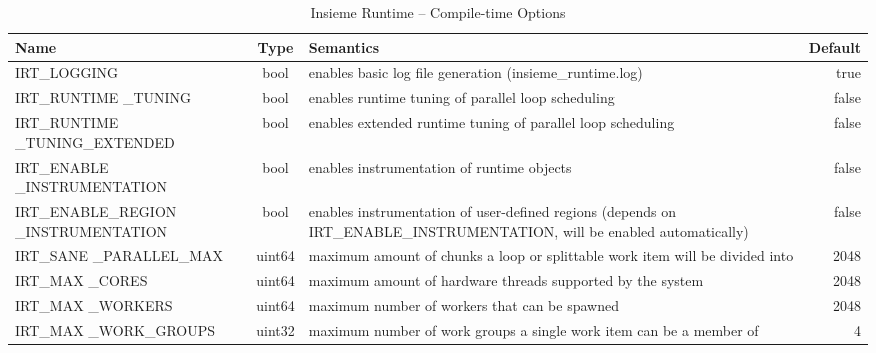\begin{table}[htbp] \small
	\centering
    \begin{tabular}{|p{4cm}|c|p{6cm}|r|}
        \hline
        Name                              & Type   & Semantics                                                                      & Default \\ \hline \hline
        IRT\_LOGGING                       & bool   & enables basic log file generation (insieme\_runtime.log)                                                                & true          \\ \hline
        IRT\_RUNTIME \_TUNING                & bool   & enables runtime tuning of parallel loop scheduling                                                                     & false         \\ \hline
        IRT\_RUNTIME \_TUNING\_EXTENDED       & bool   & enables extended runtime tuning of parallel loop scheduling                                                            & false         \\ \hline
        IRT\_ENABLE \_INSTRUMENTATION        & bool   & enables instrumentation of runtime objects                                                                             & false         \\ \hline
        IRT\_ENABLE\_REGION \_INSTRUMENTATION & bool   & enables instrumentation of user-defined regions (depends on IRT\_ENABLE\_INSTRUMENTATION, will be enabled automatically) & false         \\ \hline
        IRT\_SANE \_PARALLEL\_MAX             & uint64 & maximum amount of chunks a loop or splittable work item will be divided into                                           & 2048          \\ \hline
        IRT\_MAX \_CORES                     & uint64 & maximum amount of hardware threads supported by the system                                                             & 2048          \\ \hline
        IRT\_MAX \_WORKERS                   & uint64 & maximum number of workers that can be spawned                                                                          & 2048          \\ \hline
        IRT\_MAX \_WORK\_GROUPS               & uint32 & maximum number of work groups a single work item can be a member of                                                    & 4             \\ \hline
  \end{tabular}
	\caption{Insieme Runtime -- Compile-time Options}
	\label{tab:runtime:options:compile}
\end{table}

